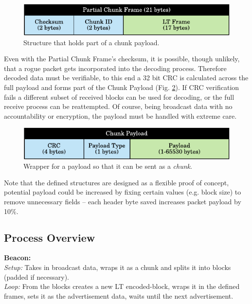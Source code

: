 \documentclass[conference]{IEEEtran} %
\begin{document}
\begin{figure}[H]
    \centering
   	\includegraphics[scale=0.75]{Figures/partial_chunk_frame}
    \caption{
    Structure that holds part of a chunk payload. 
    }
    \label{fig:partial_chunk_frame}
\end{figure}

Even with the Partial Chunk Frame's checksum, it is possible, though unlikely, that a rogue packet gets incorporated into the decoding process. Therefore decoded data must be verifiable, to this end a 32 bit CRC is calculated across the full payload and forms part of the Chunk Payload (Fig. \ref{fig:chunk_payload}). If CRC verification fails a different subset of received blocks can be used for decoding, or the full receive process can be reattempted. Of course, being broadcast data with no accountability or encryption, the payload must be handled with extreme care.

\begin{figure}[H]
    \centering
   	\includegraphics[scale=0.75]{Figures/chunk_payload}
    \caption{
    Wrapper for a payload so that it can be sent as a \textit{chunk}.
    }
    \label{fig:chunk_payload}
\end{figure}

Note that the defined structures are designed as a flexible proof of concept, potential payload could be increased by fixing certain values (e.g. block size) to remove unnecessary fields -- each header byte saved increases packet payload by 10\%.

\subsection{Process Overview}
\noindent \textbf{Beacon:}\\
\textit{Setup:} Takes in broadcast data, wraps it as a chunk and splits it into blocks (padded if necessary). 
\\ \textit{Loop:} From the blocks creates a new LT encoded-block, wraps it in the defined frames, sets it as the advertisement data, waits until the next advertisement.
\end{document}
